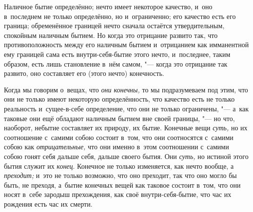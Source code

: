 
Наличное бытие определённо; нечто имеет некоторое качество, и~оно в~последнем
не только определённо, но и~ограниченно; его качество есть его граница;
обременённое границей нечто сначала остаётся утвердительным, спокойным
наличным бытием. Но когда это отрицание развито так, что противоположность
между его наличным бытием и~отрицанием как имманентной ему границей сама
есть внутри-себя-бытие этого нечто, и~последнее, таким образом, есть лишь
становление в~нём самом, "--- когда это отрицание так развито, оно составляет
его (этого нечто) конечность.

Когда мы говорим о~вещах, что {\em они конечны,} то мы
подразумеваем под этим, что они не только имеют некоторую определённость,
что качество есть не только реальность и~сущее-в-себе определение, что они не
только ограничены, "--- а~как таковые они ещё обладают наличным бытием вне
своей границы, "--- но что, наоборот, небытие составляет их природу, их бытие.
Конечные вещи {\em суть,} но их соотношение с~самими
собою состоит в~том, что они соотносятся с~самими собою как
{\em отрицательные,} что они именно в~этом соотношении
с~самими собою гонят себя дальше себя, дальше своего бытия. Они
{\em суть,} но истиной этого бытия служит их
{\em конец}. Конечное не только изменяется, как нечто
вообще, а {\em преходит;} и~это не только возможно, что
оно преходит, так что оно могло бы быть, не преходя, а~бытие конечных вещей
как таковое состоит в~том, что они носят в~себе зародыш прехождения, как
своё внутри-себя-бытие, что час их рождения есть час их смерти.

\label{ssssec:alpha}

